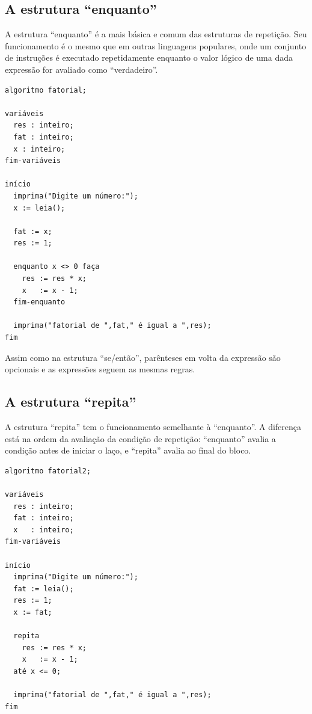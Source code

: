 \documentclass[a4paper,11pt]{report}
\begin{document}
\subsection{A estrutura ``enquanto''}

A estrutura ``enquanto'' é a mais básica e comum das estruturas de repetição.
Seu funcionamento é o mesmo que em outras linguagens populares, onde um conjunto
de instruções é executado repetidamente enquanto o valor lógico de uma dada
expressão for avaliado como ``verdadeiro''.

\begin{program}
  \begin{verbatim}
algoritmo fatorial;

variáveis
  res : inteiro;
  fat : inteiro;
  x : inteiro;
fim-variáveis

início
  imprima("Digite um número:");
  x := leia();

  fat := x;
  res := 1;

  enquanto x <> 0 faça
    res := res * x;
    x   := x - 1;
  fim-enquanto

  imprima("fatorial de ",fat," é igual a ",res);
fim
  \end{verbatim}
  \caption{Exemplo de programa que utiliza a estrutura ``enquanto''.}
\end{program}

Assim como na estrutura ``se/então'', parênteses em volta da expressão são
opcionais e as expressões seguem as mesmas regras.

\subsection{A estrutura ``repita''}

A estrutura ``repita'' tem o funcionamento semelhante à ``enquanto''. A
diferença está na ordem da avaliação da condição de repetição: ``enquanto''
avalia a condição antes de iniciar o laço, e ``repita'' avalia ao final do
bloco.

\begin{program}
  \begin{verbatim}
algoritmo fatorial2;

variáveis
  res : inteiro;
  fat : inteiro;
  x   : inteiro;
fim-variáveis

início
  imprima("Digite um número:");
  fat := leia();
  res := 1;
  x := fat;

  repita
    res := res * x;
    x   := x - 1;
  até x <= 0;

  imprima("fatorial de ",fat," é igual a ",res);
fim
  \end{verbatim}
  \caption{Exemplo de programa que utiliza a estrutura ``repita.''}
\end{program}
\end{document}
